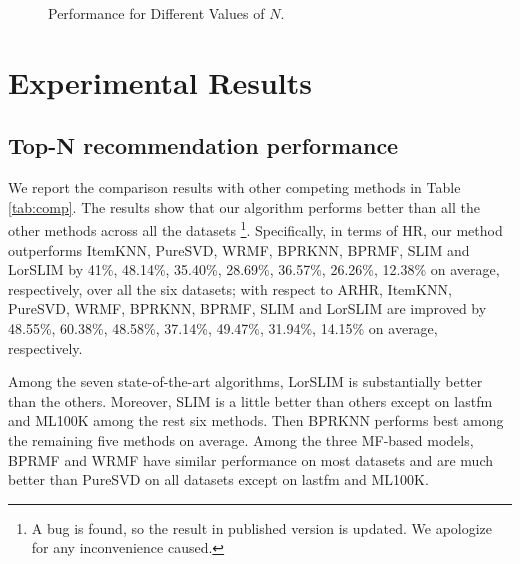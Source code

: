 \documentclass[letterpaper]{article}
\begin{document}
\begin{figure}[!ht]
\caption{ Performance for Different Values of $N$.}
\label{fig:differentN}
\end{figure}
\section{Experimental Results}
\subsection{Top-N recommendation performance}
We report the comparison results with other competing methods in Table \ref{tab:comp}.
The results show that our algorithm performs better than all the other methods across all the datasets \footnote{A bug is found, so the result in published version is updated. We apologize for any inconvenience caused.}. Specifically, in terms of HR, our method outperforms ItemKNN, PureSVD, WRMF, BPRKNN, BPRMF, SLIM and LorSLIM by 41\%, 48.14\%, 35.40\%, 28.69\%, 36.57\%, 26.26\%,  12.38\% on average, respectively, over all the six datasets; with respect to ARHR, ItemKNN, PureSVD, WRMF, BPRKNN, BPRMF, SLIM and LorSLIM are improved by 48.55\%, 60.38\%, 48.58\%, 37.14\%, 49.47\%, 31.94\%, 14.15\% on average, respectively. %

Among the seven state-of-the-art algorithms, LorSLIM is substantially better than the others. Moreover, SLIM is a little better than others except on lastfm and ML100K among the rest six methods. Then BPRKNN performs best among the remaining five methods on average.  Among the three MF-based models, BPRMF and WRMF have similar performance on most datasets and are much better than PureSVD on all datasets except on lastfm and ML100K.
\end{document}
